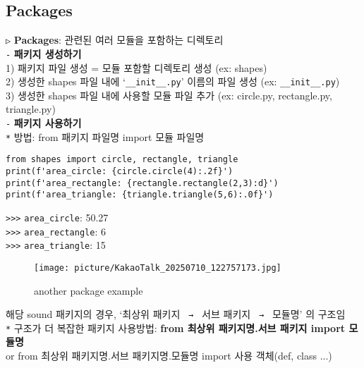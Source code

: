 \documentclass[11pt,a4paper]{article}
\begin{document}
\subsection{\Large\textbf{Packages}}
\begin{spacing}{1.5}
\texttt{▷} \textbf{Packages}: 관련된 여러 모듈을 포함하는 디렉토리\\
\texttt{-} \textbf{패키지 생성하기}\\
\hspace*{2em}1) 패키지 파일 생성 = 모듈 포함할 디렉토리 생성 (ex: shapes)\\
\hspace*{2em}2) 생성한 shapes 파일 내에 `\verb|__init__.py|' 이름의 파일 생성 (ex: \verb|__init__.py|)\\
\hspace*{2em}3) 생성한 shapes 파일 내에 사용할 모듈 파일 추가 (ex: circle.py, rectangle.py, triangle.py)\\

\texttt{-} \textbf{패키지 사용하기}\\
\texttt{*} 방법: from 패키지 파일명 import 모듈 파일명
\begin{lstlisting}[label={list:first}]
from shapes import circle, rectangle, triangle
print(f'area_circle: {circle.circle(4):.2f}')
print(f'area_rectangle: {rectangle.rectangle(2,3):d}')
print(f'area_triangle: {triangle.triangle(5,6):.0f}')
\end{lstlisting}
\verb|>>>| \verb|area_circle|: 50.27\\
\verb|>>>| \verb|area_rectangle|: 6\\
\verb|>>>| \verb|area_triangle|: 15\\
\end{spacing}

\begin{figure}[H]
    \centering
    \texttt{[image: picture/KakaoTalk\_20250710\_122757173.jpg]}
    \caption{another package example}
    \label{fig:enter-label}
\end{figure}

\begin{spacing}{1.5}
해당 sound 패키지의 경우, `최상위 패키지 \texttt{ → } 서브 패키지 \texttt{ → } 모듈명' 의 구조임\\
\texttt{*} 구조가 더 복잡한 패키지 사용방법: \textbf{from 최상위 패키지명.서브 패키지 import 모듈명}\\
\hspace*{2em}or from 최상위 패키지명.서브 패키지명.모듈명 import 사용 객체(def, class ...)\\
\end{spacing}
\end{document}
